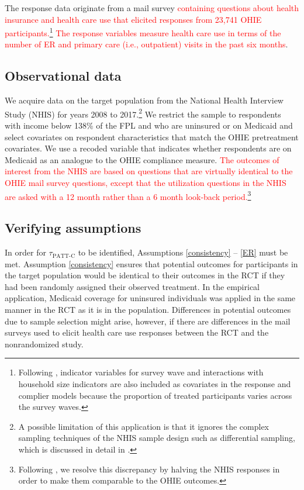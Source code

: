 \documentclass[hidelinks,12pt]{article}
\begin{document}
The response data originate from a mail survey \textcolor{red}{containing questions about health insurance and health care use that elicited responses from 23,741 OHIE participants.\footnote{Following \citet{finkelstein2012}, indicator variables for survey wave and interactions with household size indicators are also included as covariates in the response and complier models because the proportion of treated participants varies across the survey waves.} The response variables measure health care use in terms of the number of ER and primary care (i.e., outpatient) visits in the past six months}. 

\subsection{Observational data} 

We acquire data on the target population from the National Health Interview Study (NHIS) for years 2008 to 2017.\footnote{A possible limitation of this application is that it ignores the complex sampling techniques of the NHIS sample design such as differential sampling, which is discussed in detail in \citet{parsons2014design}.} We restrict the sample to respondents with income below 138\% of the FPL and who are uninsured or on Medicaid and select covariates on respondent characteristics that match the OHIE pretreatment covariates. We use a recoded variable that indicates whether respondents are on Medicaid as an analogue to the OHIE compliance measure. \textcolor{red}{The outcomes of interest from the NHIS are based on questions that are virtually identical to the OHIE mail survey questions, except that the utilization questions in the NHIS are asked with a 12 month rather than a 6 month look-back period.\footnote{Following \citet{finkelstein2012}, we resolve this discrepancy by halving the NHIS responses in order to make them comparable to the OHIE outcomes.}}

\subsection{Verifying assumptions} \label{verifying}

In order for $\tau_{\text{PATT-C}}$ to be identified, Assumptions \eqref{consistency} -- \eqref{ER} must be met. Assumption \eqref{consistency} ensures that potential outcomes for participants in the target population would be identical to their outcomes in the RCT if they had been randomly assigned their observed treatment. In the empirical application, Medicaid coverage for uninsured individuals was applied in the same manner in the RCT as it is in the population. Differences in potential outcomes due to sample selection might arise, however, if there are differences in the mail surveys used to elicit health care use responses between the RCT and the nonrandomized study. 
\end{document}
